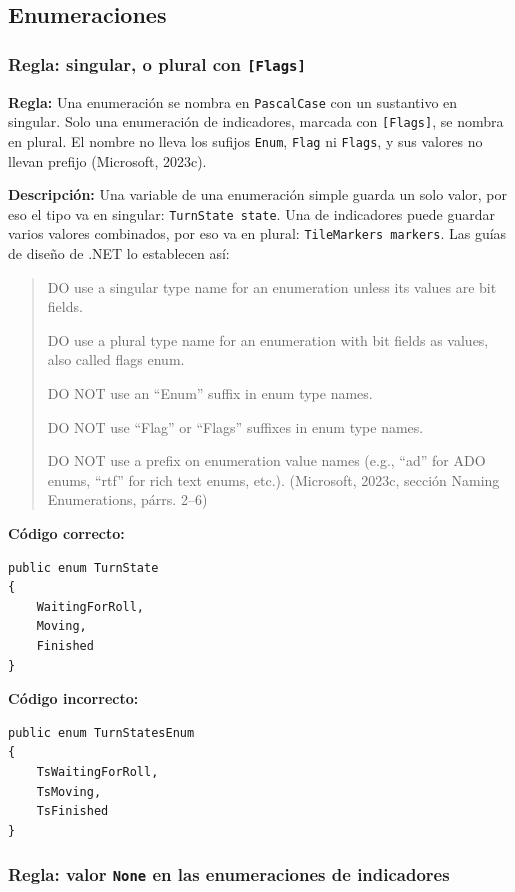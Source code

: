 \subsection{Enumeraciones}

\subsubsection{Regla: singular, o plural con \texttt{[Flags]}}

\textbf{Regla:} Una enumeración se nombra en \texttt{PascalCase} con un sustantivo en singular. Solo una enumeración de indicadores, marcada con \texttt{[Flags]}, se nombra en plural. El nombre no lleva los sufijos \texttt{Enum}, \texttt{Flag} ni \texttt{Flags}, y sus valores no llevan prefijo (Microsoft, 2023c).

\textbf{Descripción:} Una variable de una enumeración simple guarda un solo valor, por eso el tipo va en singular: \texttt{TurnState state}. Una de indicadores puede guardar varios valores combinados, por eso va en plural: \texttt{TileMarkers markers}. Las guías de diseño de .NET lo establecen así:
\begin{quote}
DO use a singular type name for an enumeration unless its values are bit fields.

DO use a plural type name for an enumeration with bit fields as values, also called flags enum.

DO NOT use an ``Enum'' suffix in enum type names.

DO NOT use ``Flag'' or ``Flags'' suffixes in enum type names.

DO NOT use a prefix on enumeration value names (e.g., ``ad'' for ADO enums, ``rtf'' for rich text enums, etc.). (Microsoft, 2023c, sección Naming Enumerations, párrs. 2--6)
\end{quote}

\textbf{Código correcto:}
\begin{lstlisting}[style=csharpstyle]
public enum TurnState
{
    WaitingForRoll,
    Moving,
    Finished
}
\end{lstlisting}

\textbf{Código incorrecto:}
\begin{lstlisting}[style=csharpstyle]
public enum TurnStatesEnum
{
    TsWaitingForRoll,
    TsMoving,
    TsFinished
}
\end{lstlisting}

\subsubsection{Regla: valor \texttt{None} en las enumeraciones de indicadores}

